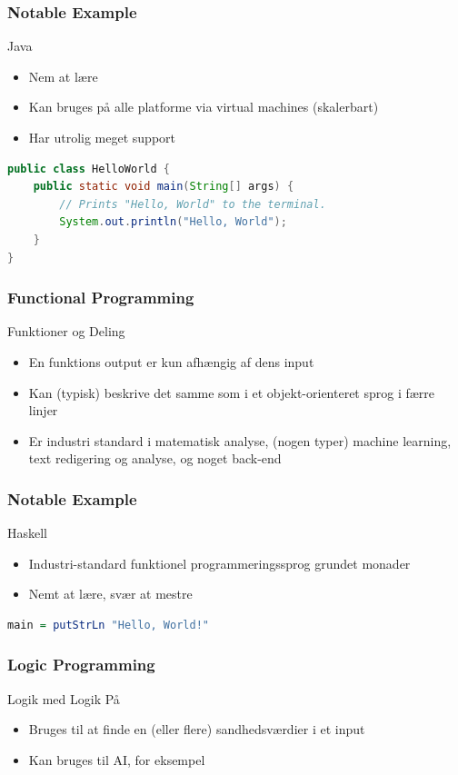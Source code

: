 \documentclass[12pt,t]{beamer}
\begin{document}
\begin{frame}[fragile]
\frametitle{Notable Example}
\begin{block}{Java}
\begin{itemize}
\item Nem at lære
\item Kan bruges på alle platforme via virtual machines (skalerbart)
\item Har utrolig meget support
\end{itemize}
\end{block}
\begin{lstlisting}[language=Java]
public class HelloWorld {
    public static void main(String[] args) {
        // Prints "Hello, World" to the terminal.
        System.out.println("Hello, World");
    }
}

\end{lstlisting}
\end{frame}

\begin{frame}
\frametitle{Functional Programming}
\begin{block}{Funktioner og Deling}
\begin{itemize}
\item En funktions output er kun afhængig af dens input
\item Kan (typisk) beskrive det samme som i et objekt-orienteret sprog i
færre linjer
\item Er industri standard i matematisk analyse, (nogen typer) machine learning,
text redigering og analyse, og noget back-end
\end{itemize}
\end{block}
\end{frame}

\begin{frame}[fragile]
\frametitle{Notable Example}
\begin{block}{Haskell}
\begin{itemize}
\item Industri-standard funktionel programmeringssprog grundet monader
\item Nemt at lære, svær at mestre
\end{itemize}
\end{block}
\begin{lstlisting}[language=Haskell]
main = putStrLn "Hello, World!"
\end{lstlisting}
\end{frame}

\begin{frame}
\frametitle{Logic Programming}
\begin{block}{Logik med Logik På}
\begin{itemize}
\item Bruges til at finde en (eller flere) sandhedsværdier i et input
\item Kan bruges til AI, for eksempel
\end{itemize}
\end{block}
\end{frame}
\end{document}
